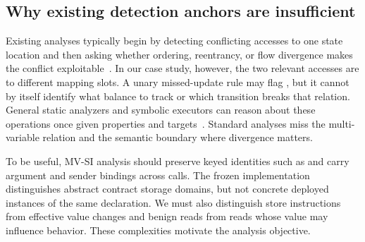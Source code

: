 \subsection{Why existing detection anchors are insufficient}
\label{s:background-gap}

Existing analyses typically begin by detecting conflicting accesses to one state location and then asking whether ordering, reentrancy, or flow divergence makes the conflict exploitable~\cite{bose2022sailfish,liu2025detecting}. In our case study, however, the two relevant accesses are to different mapping slots. A unary missed-update rule may flag , but it cannot by itself identify what balance to track or which transition breaks that relation. General static analyzers and symbolic executors can reason about these operations once given properties and targets~\cite{feist2019slither,mythril,manticore}. Standard analyses miss the multi-variable relation and the semantic boundary where divergence matters.

To be useful, MV-SI analysis should preserve keyed identities such as  and carry argument and sender bindings across calls. The frozen implementation distinguishes abstract contract storage domains, but not concrete deployed instances of the same declaration. We must also distinguish store instructions from effective value changes and benign reads from reads whose value may influence behavior. These complexities motivate the analysis objective.
